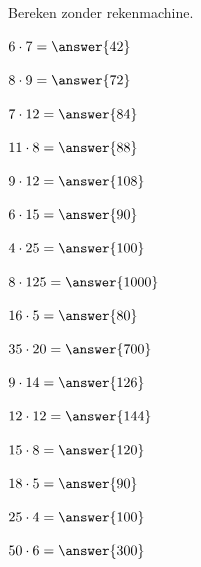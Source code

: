 \documentclass{ximera}
\begin{document}
\begin{oefening}[Tafelroutine A]{\oefB\ESS}

Bereken zonder rekenmachine.

\begin{question} \(6\cdot7=\answer{42}\) \end{question}

\begin{question} \(8\cdot9=\answer{72}\) \end{question}

\begin{question} \(7\cdot12=\answer{84}\) \end{question}

\begin{question} \(11\cdot8=\answer{88}\) \end{question}

\begin{question} \(9\cdot12=\answer{108}\) \end{question}

\begin{question} \(6\cdot15=\answer{90}\) \end{question}

\begin{question} \(4\cdot25=\answer{100}\) \end{question}

\begin{question} \(8\cdot125=\answer{1000}\) \end{question}

\begin{question} \(16\cdot5=\answer{80}\) \end{question}

\begin{question} \(35\cdot20=\answer{700}\) \end{question}

\begin{question} \(9\cdot14=\answer{126}\) \end{question}

\begin{question} \(12\cdot12=\answer{144}\) \end{question}

\begin{question} \(15\cdot8=\answer{120}\) \end{question}

\begin{question} \(18\cdot5=\answer{90}\) \end{question}

\begin{question} \(25\cdot4=\answer{100}\) \end{question}

\begin{question} \(50\cdot6=\answer{300}\) \end{question}

\end{oefening}
\end{document}
